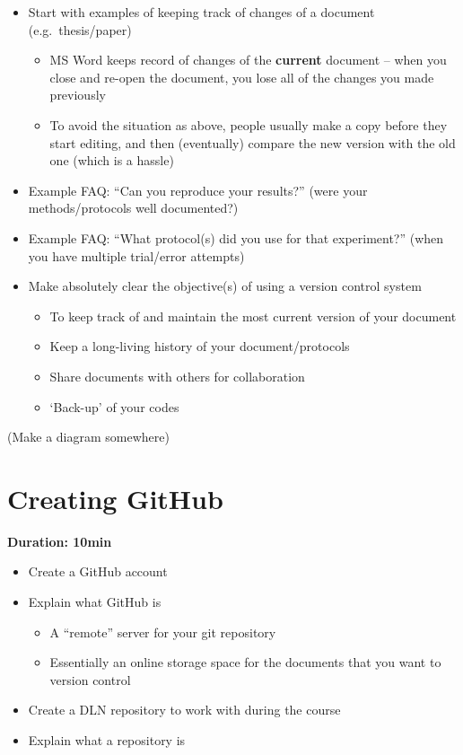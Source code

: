 \documentclass[a4paper, 12pt, oneside]{report} %
\begin{document}
\begin{itemize}
	\item Start with examples of keeping track of changes of a document (e.g.\ thesis/paper)
		\begin{itemize}
			\item MS Word keeps record of changes of the {\bfseries current} document -- when you close and re-open the document, you lose all of the changes you made previously
			\item To avoid the situation as above, people usually make a copy before they start editing, and then (eventually) compare the new version with the old one (which is a hassle)
		\end{itemize}
	\item Example FAQ: ``Can you reproduce your results?'' (were your methods/protocols well documented?)
	\item Example FAQ: ``What protocol(s) did you use for that experiment?'' (when you have multiple trial/error attempts)
	\item Make absolutely clear the objective(s) of using a version control system
		\begin{itemize}
			\item To keep track of and maintain the most current version of your document
			\item Keep a long-living history of your document/protocols
			\item Share documents with others for collaboration
			\item `Back-up' of your codes
		\end{itemize}
\end{itemize}

(Make a diagram somewhere)


\section{Creating GitHub}
\label{sec:creating_github}

{\bfseries Duration: 10min}

\begin{itemize}
	\item Create a GitHub account
	\item Explain what GitHub is
		\begin{itemize}
			\item A ``remote'' server for your git repository
			\item Essentially an online storage space for the documents that you want to version control
		\end{itemize}
	\item Create a DLN repository to work with during the course
	\item Explain what a repository is
\end{itemize}
\end{document}
